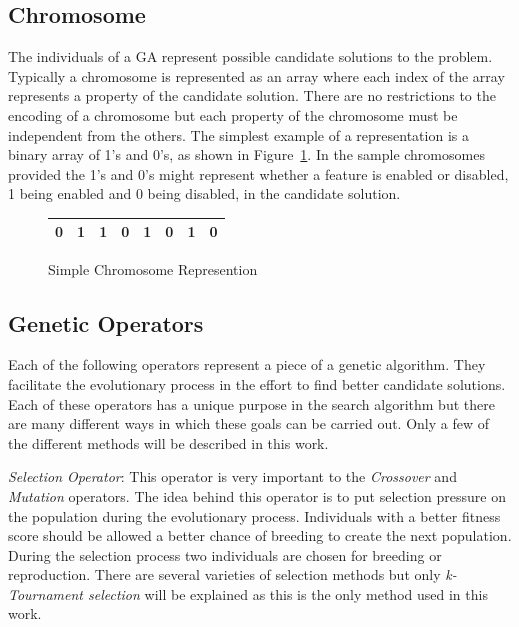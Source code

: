 \subsection{Chromosome}

The individuals of a GA represent possible candidate solutions to the problem. Typically a chromosome is represented as an array where each index of the array represents a property of the candidate solution. There are no restrictions to the encoding of a chromosome but each property of the chromosome must be independent from the others. The simplest example of a representation is a binary array of 1's and 0's, as shown in Figure~\ref{fig:sampleChromosome}. In the sample chromosomes provided the 1's and 0's might represent whether a feature is enabled or disabled, 1 being enabled and 0 being disabled, in the candidate solution.

\begin{figure}[H]
  \label{fig:sampleChromosome}
  \centering
  \begin{tabular}{ | l | l | l | l | l | l | l | l | }
    \hline
    0 & 1 & 1 & 0 & 1 & 0 & 1 & 0 \\
    \hline
  \end{tabular}
  \caption{Simple Chromosome Represention}
\end{figure}

\subsection{Genetic Operators}
\label{subsec:ga-operators}

Each of the following operators represent a piece of a genetic algorithm. They facilitate the evolutionary process in the effort to find better candidate solutions. Each of these operators has a unique purpose in the search algorithm but there are many different ways in which these goals can be carried out. Only a few of the different methods will be described in this work.

\textit{Selection Operator}: This operator is very important to the \textit{Crossover} and \textit{Mutation} operators. The idea behind this operator is to put selection pressure on the population during the evolutionary process. Individuals with a better fitness score should be allowed a better chance of breeding to create the next population. During the selection process two individuals are chosen for breeding or reproduction. There are several varieties of selection methods but only \textit{k-Tournament selection} will be explained as this is the only method used in this work.

